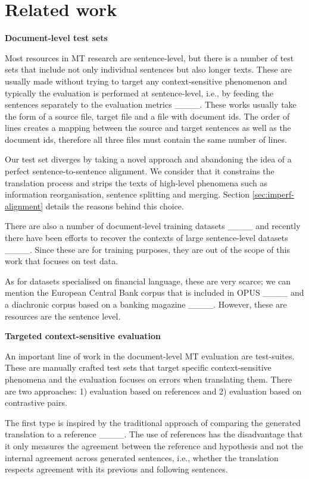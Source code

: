 \section{Related work}
\label{sec:related_work}



\textbf{Document-level test sets}

Most resources in MT research are sentence-level, but there is a number of test sets that include not only individual sentences but also longer texts. These are usually made without trying to target any context-sensitive phenomenon and typically the evaluation is performed at sentence-level, i.e., by feeding the sentences separately to the evaluation metrics ____.
These works usually take the form of a source file, target file and a file with document ids. The order of lines creates a mapping between the source and target sentences as well as the document ids, therefore all three files must contain the same number of lines.

Our test set diverges by taking a novel approach and abandoning the idea of a perfect sentence-to-sentence alignment. We consider that it constrains the translation process and strips the texts of high-level phenomena such as information reorganisation, sentence splitting and merging. 
Section \ref{sec:imperf-alignment} details the reasons behind this choice.

There are also a number of document-level training datasets ____ and recently there have been efforts to recover the contexts of large sentence-level datasets ____. Since these are for training purposes, they are out of the scope of this work that focuses on test data.

As for datasets specialised on financial language, these are very scarce; we can mention the European Central Bank corpus that is included in OPUS ____ and a diachronic corpus based on a banking magazine ____. However, these are resources are the sentence level.

\textbf{Targeted context-sensitive evaluation}

An important line of work in the document-level MT evaluation are test-suites. These are manually crafted test sets that target specific context-sensitive phenomena and the evaluation focuses on errors when translating them. There are two approaches: 1) evaluation based on references and 2) evaluation based on contrastive pairs.

The first type is inspired by the traditional approach of comparing the generated translation to a reference ____.
The use of references has the disadvantage that it only measures the agreement between the reference and hypothesis and not the internal agreement across generated sentences, i.e., whether the translation respects agreement with its previous and following sentences.

